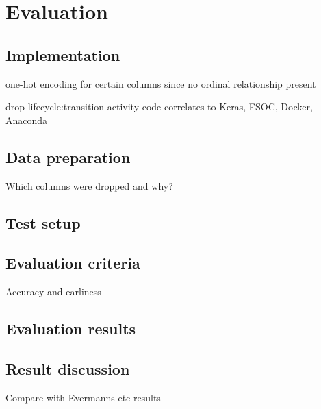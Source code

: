 \chapter{Evaluation}\label{sec:evaluation}


\section{Implementation}
one-hot encoding for certain columns since no ordinal relationship present

drop lifecycle:transition
activity code correlates to 
Keras, FSOC, Docker, Anaconda

\section{Data preparation}
Which columns were dropped and why?

\section{Test setup}

\section{Evaluation criteria}
Accuracy and earliness

\section{Evaluation results}

\section{Result discussion}
Compare with Evermanns etc results